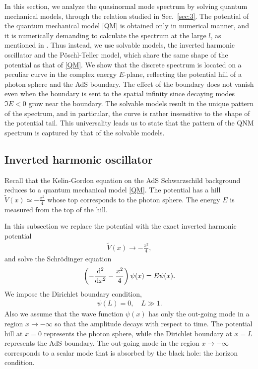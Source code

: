 \documentclass[a4paper,11pt]{article}
\begin{document}
In this section,
we analyze the quasinormal mode spectrum by solving quantum mechanical models, through the relation studied in Sec.~\ref{sec:3}.
The potential of the quantum mechanical model \eqref{QM} is obtained only in numerical manner, and it is numerically demanding to calculate the spectrum at the large $l$, as mentioned in \cite{Horowitz:1999jd}.
Thus instead, we use solvable models, the inverted harmonic oscillator and the P\"{o}schl-Teller model,  which share the same shape of the potential as that of \eqref{QM}. 
We show that the discrete spectrum is located on a peculiar curve in the complex energy $E$-plane, reflecting the potential hill of a photon sphere and the AdS boundary.
The effect of the boundary does not vanish even when the boundary is sent to the spatial infinity since decaying modes $\Im E<0$ grow near the boundary.
The solvable models result in the 
unique pattern of the spectrum, and in particular, the curve is rather insensitive to the shape of the potential tail. This universality leads us to state that the pattern of the QNM spectrum is captured by that of
the solvable models.



\subsection{Inverted harmonic oscillator}

Recall that
the Kelin-Gordon equation on the AdS Schwarzschild background
reduces to a quantum mechanical model \eqref{QM}.
The potential has a hill $\widetilde{V}(x)\simeq -\frac{x^2}{4}$ whose top corresponds to the photon sphere.
The energy $E$ is measured from the top of the hill.

In this subsection we replace the potential with the exact inverted harmonic potential
\begin{align}
    \widetilde{V}(x) \rightarrow -\frac{x^2}{4},
\end{align}
and solve the Schr\"{o}dinger equation
\begin{align}
    \left(
	-\dv[2]{x} - \frac{x^2}{4}
    \right) \psi(x)
    = E\psi(x).
\end{align}
We impose the Dirichlet boundary condition,
\begin{align}
    \psi(L) = 0,
    \quad L \gg 1.
\end{align}
Also we assume that
the wave function $\psi(x)$ has only the out-going mode in a region $x\rightarrow-\infty$ so that the amplitude decays with respect to time.
%
The potential hill at $x=0$ represents the photon sphere, while the Dirichlet boundary at $x=L$ represents the AdS boundary.
The out-going mode in the region $x\rightarrow-\infty$ corresponds to a scalar mode that is absorbed by the black hole: the horizon condition.
\end{document}
